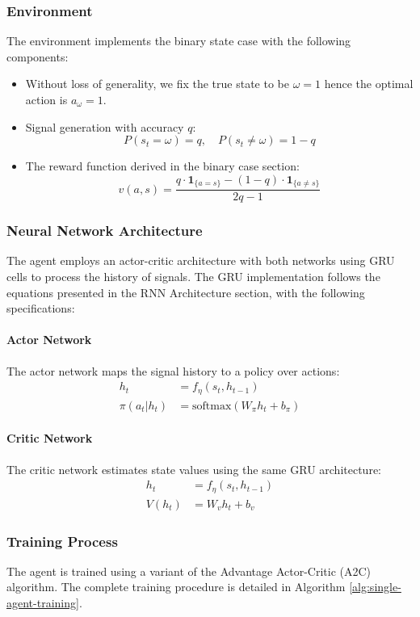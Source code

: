 \subsubsection*{Environment}
The environment implements the binary state case with the following components:

\begin{itemize}
    \item Without loss of generality, we fix the true state to be $\omega = 1$ hence the optimal action is $a_\omega = 1$.
    \item Signal generation with accuracy $q$:
    \[
        P(s_t = \omega) = q, \quad P(s_t \neq \omega) = 1-q
    \]
    \item The reward function derived in the binary case section:
    \[
        v(a,s) = \frac{q \cdot \mathbf{1}_{\{a = s\}} - (1-q) \cdot \mathbf{1}_{\{a \neq s\}}}{2q-1}
    \]
\end{itemize}

\subsubsection*{Neural Network Architecture}
The agent employs an actor-critic architecture with both networks using GRU cells to process the history of signals. The GRU implementation follows the equations presented in the RNN Architecture section, with the following specifications:

\paragraph{Actor Network}
The actor network maps the signal history to a policy over actions:
\begin{align*}
    h_t &= f_{\eta}(s_t, h_{t-1}) \\
    \pi(a_t|h_t) &= \text{softmax}(W_\pi h_t + b_\pi)
\end{align*}

\paragraph{Critic Network}
The critic network estimates state values using the same GRU architecture:
\begin{align*}
    h_t &= f_{\eta}(s_t, h_{t-1}) \\
    V(h_t) &= W_v h_t + b_v
\end{align*}

\subsubsection*{Training Process}
The agent is trained using a variant of the Advantage Actor-Critic (A2C) algorithm. The complete training procedure is detailed in Algorithm \ref{alg:single-agent-training}.

